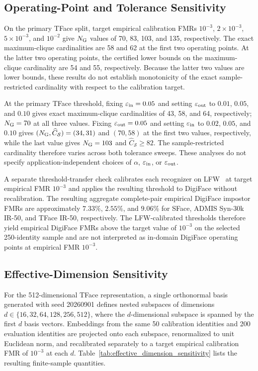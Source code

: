 \documentclass[journal]{IEEEtran}
\begin{document}
\begin{bibunit}
\subsection{Operating-Point and Tolerance Sensitivity}

On the primary TFace split, target empirical calibration FMRs $10^{-3}$, $2\times10^{-3}$, $5\times10^{-3}$, and $10^{-2}$ give $N_{\rm G}$ values of 70, 83, 103, and 135, respectively. The exact maximum-clique cardinalities are 58 and 62 at the first two operating points. At the latter two operating points, the certified lower bounds on the maximum-clique cardinality are 54 and 55, respectively. Because the latter two values are lower bounds, these results do not establish monotonicity of the exact sample-restricted cardinality with respect to the calibration target.

At the primary TFace threshold, fixing $\varepsilon_{\rm in}=0.05$ and setting $\varepsilon_{\rm out}$ to $0.01$, $0.05$, and $0.10$ gives exact maximum-clique cardinalities of 43, 58, and 64, respectively; $N_{\rm G}=70$ at all three values. Fixing $\varepsilon_{\rm out}=0.05$ and setting $\varepsilon_{\rm in}$ to $0.02$, $0.05$, and $0.10$ gives $(N_{\rm G},\widehat C_{\mathcal S})=(34,31)$ and $(70,58)$ at the first two values, respectively, while the last value gives $N_{\rm G}=103$ and $\widehat C_{\mathcal S}\ge82$. The sample-restricted cardinality therefore varies across both tolerance sweeps. These analyses do not specify application-independent choices of $\alpha$, $\varepsilon_{\rm in}$, or $\varepsilon_{\rm out}$.

A separate threshold-transfer check calibrates each recognizer on LFW~\cite{huang2008labeled} at target empirical FMR $10^{-3}$ and applies the resulting threshold to DigiFace without recalibration. The resulting aggregate complete-pair empirical DigiFace impostor FMRs are approximately $7.33\%$, $2.55\%$, and $9.06\%$ for SFace, ADMIS Syn-30k IR-50, and TFace IR-50, respectively. The LFW-calibrated thresholds therefore yield empirical DigiFace FMRs above the target value of $10^{-3}$ on the selected 250-identity sample and are not interpreted as in-domain DigiFace operating points at empirical FMR $10^{-3}$.



\subsection{Effective-Dimension Sensitivity}

For the 512-dimensional TFace representation, a single orthonormal basis generated with seed 20260901 defines nested subspaces of dimensions $d\in\{16,32,64,128,256,512\}$, where the $d$-dimensional subspace is spanned by the first $d$ basis vectors. Embeddings from the same 50 calibration identities and 200 evaluation identities are projected onto each subspace, renormalized to unit Euclidean norm, and recalibrated separately to a target empirical calibration FMR of $10^{-3}$ at each $d$. Table~\ref{tab:effective_dimension_sensitivity} lists the resulting finite-sample quantities.


\end{bibunit}
\end{document}
